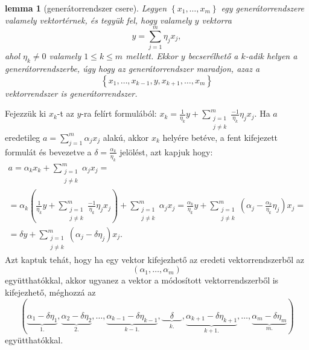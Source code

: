 \documentclass[9pt, a4paper, showtrims]{memoir}
\makeatletter
\renewenvironment{proof}[1][\proofname]
    {\par\pushQED{\qed}%
    \normalfont \topsep6\p@\@plus6\p@\relax
    \trivlist
    \item[\hskip\labelsep
        \itshape
    #1\@addpunct{:}]\ignorespaces}
    {\popQED\endtrivlist\@endpefalse}
\theoremstyle{plain}
\newtheorem{lemma}[proposition]{lemma}
\theoremstyle{remark}
\theoremstyle{definition}
\makeatother
\begin{document}
\begin{lemma}[generátorrendszer csere]\label{le:gencsere}
	Legyen $\left\{ x_1,\ldots,x_m \right\}$ egy generátorrendszere valamely vektortérnek,
	és tegyük fel, hogy valamely $y$ vektorra
	\[
		y=\sum_{j=1}^m\eta_jx_j,
	\]
	ahol $\eta_k\neq 0$ valamely $1\leq k\leq m$ mellett.
	Ekkor $y$ becserélhető a $k$-adik helyen a generátorrendszerbe,
	úgy hogy az generátorrendszer maradjon, azaz a
	\[
		\left\{ x_1,\ldots,x_{k-1},y,x_{k+1},\ldots,x_m \right\}
	\]
	vektorrendszer is generátorrendszer.
\end{lemma}
\begin{proof}
	Fejezzük ki $x_k$-t az $y$-ra felírt formulából:
	\(\displaystyle
	x_k=\frac{1}{\eta_k}y+\sum_{\substack{j=1\\j\neq k}}^m\frac{-1}{\eta_k}\eta_jx_j.
	\)
	Ha $a$ eredetileg
	\(\displaystyle
	a=\sum_{j=1}^m\alpha_jx_j
	\)
	alakú, akkor $x_k$ helyére betéve, a fent kifejezett formulát és bevezetve a
	$\delta=\frac{\alpha_k}{\eta_k}$ jelölést, azt kapjuk hogy:
	\begin{multline*}
		a=\alpha_kx_k+\sum_{\substack{j=1\\j\neq k}}^m\alpha_jx_j=
		\\
		=
		\alpha_k
		\left(
		\frac{1}{\eta_k}y+\sum_{\substack{j=1\\j\neq k}}^m\frac{-1}{\eta_k}\eta_jx_j
		\right)
		+\sum_{\substack{j=1\\j\neq k}}^m\alpha_jx_j
		=
		\frac{\alpha_k}{\eta_k}y+
		\sum_{\substack{j=1\\j\neq k}}^m\left( \alpha_j-\frac{\alpha_k}{\eta_k}\eta_j \right)x_j=
		\\
		=\delta y+
		\sum_{\substack{j=1\\j\neq k}}^m\left( \alpha_j-\delta\eta_j \right)x_j.
	\end{multline*}
	Azt kaptuk tehát, hogy ha egy vektor kifejezhető az eredeti vektorrendszerből az
	\[
		\left( \alpha_1,\ldots,\alpha_m \right)
	\]
	együtthatókkal, akkor ugyanez a vektor a módosított vektorrendszerből is kifejezhető,
	méghozzá az
	\[
		\left(
		\underbrace{\alpha_1-\delta\eta_1}_{1.},
		\underbrace{\alpha_2-\delta\eta_2}_{2.},
		\ldots,
		\underbrace{\alpha_{k-1}-\delta\eta_{k-1}}_{k-1.},
		\underbrace{\quad\delta\quad}_{k.},
		\underbrace{\alpha_{k+1}-\delta\eta_{k+1}}_{k+1.},
        \ldots,
		\underbrace{\alpha_m-\delta\eta_m}_{m.}
		\right)
	\]
	együtthatókkal.
\end{proof}
\end{document}
